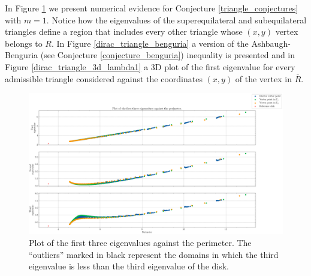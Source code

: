 In Figure \ref{dirac_smooth_first_eigenvalues} we present numerical evidence for Conjecture \ref{triangle_conjectures} with \(m=1\). Notice how the eigenvalues of the superequilateral and subequilateral triangles define a region that includes every other triangle whose \((x, y)\) vertex belongs to \(R\). In Figure \ref{dirac_triangle_benguria} a version of the Ashbaugh-Benguria (see Conjecture \ref{conjecture_benguria}) inequality is presented and in Figure \ref{dirac_triangle_3d_lambda1} a 3D plot of the first eigenvalue for every admissible triangle considered against the coordinates \((x,y)\) of the vertex in \(\overline{R}\).

\begin{figure}[!htb]
    \centering
    \begin{minipage}[c]{0.8\textwidth}
        \centering
        \includegraphics[width=\textwidth]{Images/Dirac/triangles/triangle_first_eigenvalues.png}
        \caption{Plot of the first three eigenvalues against the perimeter. The ``outliers'' marked in black represent the domains in which the third eigenvalue is less than the third eigenvalue of the disk.}
        \label{dirac_smooth_first_eigenvalues}
    \end{minipage}

    \vspace{0.5cm}


\end{figure}
